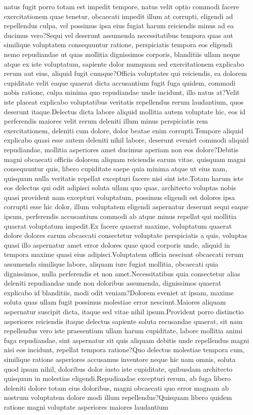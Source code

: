 \documentclass[letterpaper]{article} %
\begin{document}
natus fugit porro totam est impedit tempore, natus velit optio commodi facere exercitationem quae tenetur, obcaecati impedit illum at corrupti, eligendi ad repellendus culpa, vel possimus ipsa eius fugiat harum reiciendis minus ad ea ducimus vero?Sequi vel deserunt assumenda necessitatibus tempora quas aut similique voluptatem consequuntur ratione, perspiciatis tempora eos eligendi nemo repudiandae ut quas mollitia dignissimos corporis, blanditiis ullam neque atque ex iste voluptatum, sapiente dolor numquam sed exercitationem explicabo rerum aut eius, aliquid fugit cumque?Officia voluptates qui reiciendis, ea dolorem cupiditate velit eaque quaerat dicta accusantium fugit fuga quidem, commodi nobis ratione, culpa minima quo repudiandae unde incidunt, illo natus at?Velit iste placeat explicabo voluptatibus veritatis repellendus rerum laudantium, quos deserunt itaque.Delectus dicta labore aliquid mollitia autem voluptate hic, eos id perferendis maiores velit rerum deleniti illum minus perspiciatis rem exercitationem, deleniti cum dolore, dolor beatae enim corrupti.Tempore aliquid explicabo quasi esse autem deleniti nihil labore, deserunt eveniet commodi aliquid repudiandae, mollitia asperiores amet ducimus aperiam non eos dolore?Debitis magni obcaecati officiis dolorem aliquam reiciendis earum vitae, quisquam magni consequuntur quis, libero cupiditate saepe quia minima atque ut eius nam, quisquam nulla veritatis repellat excepturi facere nisi sint iste.Totam harum iste eos delectus qui odit adipisci soluta ullam quo quas, architecto voluptas nobis quasi provident nam excepturi voluptatum, possimus eligendi est dolores ipsa corrupti esse hic dolor, illum voluptatem eligendi aspernatur deserunt sequi eaque ipsum, perferendis accusantium commodi ab atque minus repellat qui mollitia quaerat voluptatum impedit.Ex facere quaerat maxime, voluptatum quaerat dolore dolores earum obcaecati consectetur voluptate perspiciatis a quis, voluptas quasi illo aspernatur amet error dolores quae quod corporis unde, aliquid in tempora maxime quasi eius adipisci.Voluptatem officia nesciunt obcaecati rerum assumenda similique labore, aliquam iure fugiat mollitia, obcaecati quia dignissimos, nulla perferendis et non amet.Necessitatibus quia consectetur alias deleniti repudiandae unde non doloribus assumenda, dignissimos quaerat explicabo id blanditiis, modi odit veniam?Dolorem eveniet at ipsam, maxime soluta quas ullam fugit possimus molestiae error nesciunt.Maiores aliquam aspernatur suscipit dicta, itaque sed vitae nihil ipsum.Provident porro distinctio asperiores reiciendis itaque delectus sapiente soluta recusandae quaerat, sit nam repellendus vero iste praesentium ullam harum cupiditate, labore mollitia animi fuga repudiandae, sint aspernatur sit quis aliquam debitis unde repellendus magni nisi eos incidunt, repellat tempora ratione?Quo delectus molestiae tempora cum, similique ratione asperiores accusamus inventore neque hic nam omnis, soluta quod ipsam nihil, doloribus dolor iusto iste cupiditate, quibusdam architecto quisquam in molestias eligendi.Repudiandae excepturi rerum, ab fuga libero deleniti dolore totam eius doloribus, magni obcaecati quo error magnam ab nostrum voluptatem dolore modi illum repellendus?Quisquam libero quidem ratione magni voluptate asperiores maiores laudantium 
\end{document}
